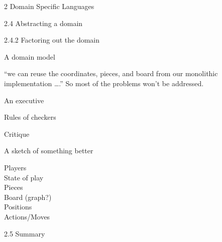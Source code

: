 \documentclass[12pt]{PalisadesLakesBook}
\begin{document}
\begin{plSection}{}
\begin{plSection}{2 Domain Specific Languages}
\begin{plSection}{2.4 Abstracting a domain}
\begin{plSection}{2.4.2 Factoring out the domain}
\begin{plSection}{A domain model}

``we can reuse the coordinates, pieces, and board from our
monolithic implementation {\ldots}.''
So most of the problems won't be addressed.


\end{plSection}%
\begin{plSection}{An executive}

\end{plSection}%
\begin{plSection}{Rules of checkers}

\end{plSection}%
\begin{plSection}{Critique}

\end{plSection}%
\end{plSection}%
\begin{plSection}{A sketch of something better}

\begin{description}
\item[Players]
\item[State of play]
\item[Pieces]
\item[Board (graph?)]
\item[Positions]
\item[Actions/Moves]
\end{description}


\end{plSection}%
\end{plSection}%
\begin{plSection}{2.5 Summary}


\end{plSection}%
\end{plSection}%
\end{plSection}%
\end{document}
